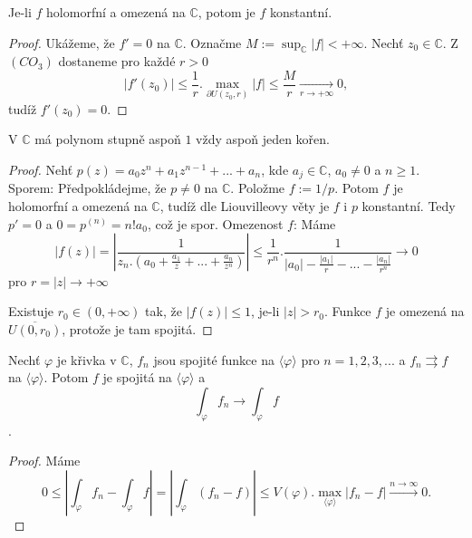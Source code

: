 
\begin{theorem}[Liouville]
Je-li $f$ holomorfní  a omezená na $\mathbb{C}$, potom je $f$ konstantní.
\end{theorem}

\begin{proof}
Ukážeme, že $f'=0$ na $\mathbb{C}$. Označme $M:=\sup_\mathbb{C}{|f|}<+\infty$. Nechť $z_0\in\mathbb{C}$. Z $(CO_3)$ dostaneme pro každé $r>0$
\[|f'(z_0)|\leq
\frac{1}{r}.\max_{\partial{U(z_0,r)}}{|f|}\leq
\frac{M}{r}\underset{{r\to{+\infty}}}{\to}0,\]
tudíž $f'(z_0)=0$.
\end{proof}

\begin{consequence}
V $\mathbb{C}$ má polynom stupně aspoň $1$ vždy aspoň jeden kořen.
\end{consequence}

\begin{proof}
Nehť $p(z)={a_0}{z^n}+{a_1}{z^{n-1}}+...+{a_n}$, kde $a_j\in\mathbb{C}$, $a_0\neq{0}$ a $n\geq{1}$.\newline
Sporem: Předpokládejme, že $p\neq{0}$ na $\mathbb{C}$. Položme $f:=1/p$. Potom $f$ je holomorfní a omezená na $\mathbb{C}$, tudíž dle Liouvilleovy věty je $f$ i $p$ konstantní. Tedy $p'=0$ a $0=p^{(n)}=n!{a_0}$, což je spor.\newline
Omezenost $f$: Máme
\[|f(z)|=\left\lvert\frac{1}{z_n.\left(a_0+\frac{a_1}{z}+...+\frac{a_n}{z^n}\right)}\right\lvert\leq
\frac{1}{r^n}.\frac{1}{|a_0|-\frac{|a_1|}{r}-...-\frac{|a_n|}{r^n}}\longrightarrow 0\]
pro $r=|z|\to+\infty$

Existuje $r_0\in(0,+\infty)$ tak, že $|f(z)|\leq{1}$, je-li $|z|>r_0$. Funkce $f$ je omezená na $\overline{U(0,r_0)}$, protože je tam spojitá.
\end{proof}

\begin{lemma}
Nechť $\varphi$ je křivka v $\mathbb{C}$, $f_n$ jsou spojité funkce na $\langle\varphi\rangle$ pro $n=1,2,3,...$ a $f_n\rightrightarrows{f}$ na $\langle\varphi\rangle$. Potom $f$ je spojitá na $\langle\varphi\rangle$ a 
\[\int_\varphi{f_n}\longrightarrow\int_\varphi{f}\].
\end{lemma}

\begin{proof}
Máme
\[0\leq\left\lvert{\int_\varphi{f_n}-\int_\varphi{f}}\right\lvert=
\left\lvert{\int_\varphi{(f_n-f)}}\right\lvert\leq{}
V(\varphi).\max_{\langle\varphi\rangle}{|f_n-f|}\overset{n\to\infty}{\longrightarrow}0.\]
\end{proof}


